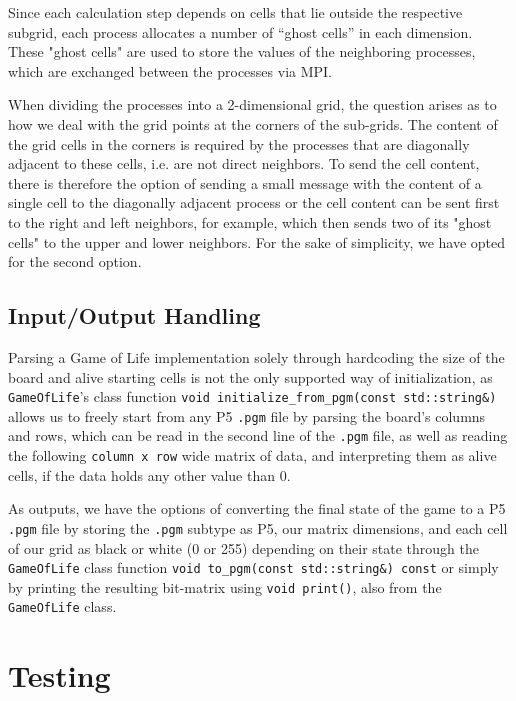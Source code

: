 \documentclass[11pt]{article}
\begin{document}
Since each calculation step depends on cells that lie outside the respective subgrid, each process allocates a number of “ghost cells” in each dimension. These "ghost cells" are used to store the values of the neighboring processes, which are exchanged between the processes via MPI. 

When dividing the processes into a 2-dimensional grid, the question arises as to how we deal with the grid points at the corners of the sub-grids. The content of the grid cells in the corners is required by the processes that are diagonally adjacent to these cells, i.e. are not direct neighbors. To send the cell content, there is therefore the option of sending a small message with the content of a single cell to the diagonally adjacent process or the cell content can be sent first to the right and left neighbors, for example, which then sends two of its "ghost cells" to the upper and lower neighbors. For the sake of simplicity, we have opted for the second option.

\subsection{Input/Output Handling}
Parsing a Game of Life implementation solely through hardcoding the size of the board and alive starting cells is not the only supported way of initialization, as \texttt{GameOfLife}'s class function \texttt{void initialize\_from\_pgm(const std::string\&)} allows us to freely start from any P5 \texttt{.pgm} file by parsing the board's columns and rows, which can be read in the second line of the \texttt{.pgm} file, as well as reading the following \texttt{column x row} wide matrix of data, and interpreting them as alive cells, if the data holds any other value than 0.

As outputs, we have the options of converting the final state of the game to a P5 \texttt{.pgm} file by storing the \texttt{.pgm} subtype as P5, our matrix dimensions, and each cell of our grid as black or white (0 or 255) depending on their state through the \texttt{GameOfLife} class function \texttt{void to\_pgm(const std::string\&) const} or simply by printing the resulting bit-matrix using \texttt{void print()}, also from the \texttt{GameOfLife} class.

\section{Testing}
\end{document}
